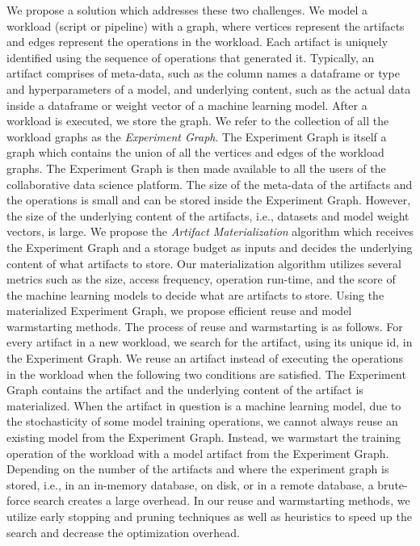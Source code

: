 We propose a solution which addresses these two challenges.
We model a workload (script or pipeline) with a graph, where vertices represent the artifacts and edges represent the operations in the workload.
Each artifact is uniquely identified using the sequence of operations that generated it.
Typically, an artifact comprises of meta-data, such as the column names a dataframe or type and hyperparameters of a model,  and underlying content, such as the actual data inside a dataframe or weight vector of a machine learning model.
After a workload is executed, we store the graph.
We refer to the collection of all the workload graphs as the \textit{Experiment Graph}.
The Experiment Graph is itself a graph which contains the union of all the vertices and edges of the workload graphs.
The Experiment Graph is then made available to all the users of the collaborative data science platform.
The size of the meta-data of the artifacts and the operations is small and can be stored inside the Experiment Graph.
However, the size of the underlying content of the artifacts, i.e., datasets and model weight vectors, is large.
We propose the \textit{Artifact Materialization} algorithm which receives the Experiment Graph and a storage budget as inputs and decides the underlying content of what artifacts to store.
Our materialization algorithm utilizes several metrics such as the size, access frequency, operation run-time, and the score of the machine learning models to decide what are artifacts to store.
Using the materialized Experiment Graph, we propose efficient reuse and model warmstarting methods.
The process of reuse and warmstarting is as follows.
For every artifact in a new workload, we search for the artifact, using its unique id, in the Experiment Graph.
We reuse an artifact instead of executing the operations in the workload when the following two conditions are satisfied.
The Experiment Graph contains the artifact and the underlying content of the artifact is materialized.
When the artifact in question is a machine learning model, due to the stochasticity of some model training operations, we cannot always reuse an existing model from the Experiment Graph.
Instead, we warmstart the training operation of the workload with a model artifact from the Experiment Graph.
Depending on the number of the artifacts and where the experiment graph is stored, i.e., in an in-memory database, on disk, or in a remote database, a brute-force search creates a large overhead.
In our reuse and warmstarting methods, we utilize early stopping and pruning techniques as well as heuristics to speed up the search and decrease the optimization overhead.

